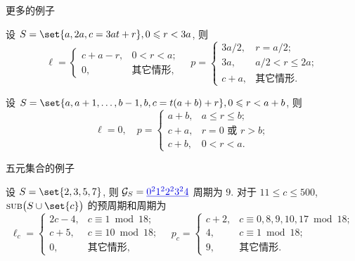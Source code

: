\documentclass[aspectratio=169,handout]{ctexbeamer}
\DeclareMathOperator*{\SUB}{{\text{\mdseries{\upshape\textsc{sub}}}}}
\renewcommand\ul[1]{{\color{main}\underline{#1}}}
\begin{document}
\begin{frame}{更多的例子}
  \onslide<+->
  \begin{proposition}
    设 $S=\set{a,2a,c=3at+r},0\le r<3a$, 则
    \[
      \ell=\begin{cases}
        c+a-r,&0<r<a;\\
        0,&\text{其它情形},
      \end{cases}\quad 
      p=\begin{cases}
        3a/2,&r=a/2;\\
        3a,&a/2<r\le 2a;\\
        c+a,&\text{其它情形.}
      \end{cases}
    \]
  \end{proposition}
  \onslide<+->
  \begin{proposition}
    设 $S=\set{a,a+1,\dots,b-1,b,c=t(a+b)+r},0\le r<a+b$, 则
    \[\ell=0,\quad p=\begin{cases}
      a+b,&a\le r\le b;\\
      c+a,&r=0\text{ 或 }r>b;\\
      c+b,&0<r<a.
    \end{cases}\]
  \end{proposition}
\end{frame}


\begin{frame}{五元集合的例子}
  \onslide<+->
  \begin{example}
    设 $S=\set{2,3,5,7}$, 则 $\CG_S=\ul{0^2 1^2 2^2 3^2 4}$ 周期为 $9$.
    对于 $11\le c\le 500$, $\SUB\bigl(S\cup\set{c}\bigr)$ 的预周期和周期为
    \[\ell_c=\begin{cases}
      2c-4,&c\equiv1\bmod{18};\\
      c+5,&c\equiv10\bmod{18};\\
      0,&\text{其它情形},
    \end{cases}\quad
      p_c=\begin{cases}
      c+2, &c\equiv0,8,9,10,17\bmod{18};\\
      4, &c\equiv1\bmod{18};\\
      9, &\text{其它情形}.
    \end{cases}\]
  \end{example}
\end{frame}
\end{document}

